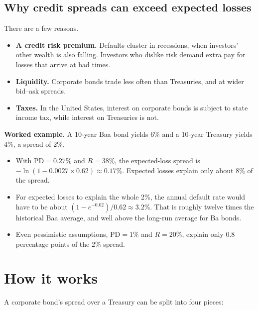 \subsection{Why credit spreads can exceed expected losses}

There are a few reasons.

\begin{itemize}
  \item \textbf{A credit risk premium.} Defaults cluster in recessions, when investors' other wealth is also falling. Investors who dislike risk demand extra pay for losses that arrive at bad times.
  \item \textbf{Liquidity.} Corporate bonds trade less often than Treasuries, and at wider bid--ask spreads.
  \item \textbf{Taxes.} In the United States, interest on corporate bonds is subject to state income tax, while interest on Treasuries is not.
\end{itemize}

\textbf{Worked example.} A 10-year Baa bond yields 6\% and a 10-year Treasury yields 4\%, a spread of 2\%.

\begin{itemize}
  \item With $\mathrm{PD} = 0.27\%$ and $R = 38\%$, the expected-loss spread is $-\ln(1 - 0.0027 \times 0.62) \approx 0.17\%$. Expected losses explain only about 8\% of the spread.
  \item For expected losses to explain the whole 2\%, the annual default rate would have to be about $(1 - e^{-0.02})/0.62 \approx 3.2\%$. That is roughly twelve times the historical Baa average, and well above the long-run average for Ba bonds.
  \item Even pessimistic assumptions, $\mathrm{PD} = 1\%$ and $R = 20\%$, explain only 0.8 percentage points of the 2\% spread.
\end{itemize}




\section{How it works}
\label{sec:15-how}

A corporate bond's spread over a Treasury can be split into four pieces:

